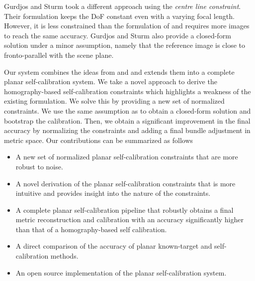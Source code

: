 \documentclass[10pt,twocolumn,letterpaper]{article}
\begin{document}
Gurdjos and Sturm \cite{gurdjos2003} took a different approach using the \emph{centre line constraint}. Their formulation keeps the DoF constant even with a varying focal length. However, it is less constrained than the formulation of \cite{bocquillon2006} and requires more images to reach the same accuracy. Gurdjos and Sturm also provide a closed-form solution under a minor assumption, namely that the reference image is close to fronto-parallel with the scene plane.

Our system combines the ideas from \cite{bocquillon2006} and \cite{gurdjos2003} and extends them into a complete planar self-calibration system. We take a novel approach to derive the homography-based self-calibration constraints which highlights a weakness of the existing formulation. We solve this by providing a new set of normalized constraints. We use the same assumption as \cite{gurdjos2003} to obtain a closed-form solution and bootstrap the calibration. Then, we obtain a significant improvement in the final accuracy by normalizing the constraints and adding a final bundle adjustment in metric space. Our contributions can be summarized as follows
\begin{itemize}

\item A new set of normalized planar self-calibration constraints that are more robust to noise.

\item A novel derivation of the planar self-calibration constraints that is more intuitive and provides insight into the nature of the constraints.

\item A complete planar self-calibration pipeline that robustly obtains a final metric reconstruction and calibration with an accuracy significantly higher than that of a homography-based self calibration.

\item A direct comparison of the accuracy of planar known-target and self-calibration methods.

\item An open source implementation of the planar self-calibration system.

\end{itemize}
\end{document}
